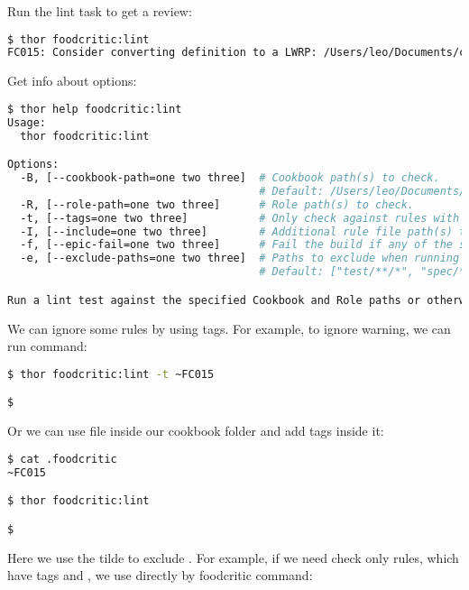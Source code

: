 Run the lint task to get a review:

\begin{lstlisting}[language=Bash,label=lst:testing-thor4]
$ thor foodcritic:lint
FC015: Consider converting definition to a LWRP: /Users/leo/Documents/chef_book/code/my-server-cloud/site-cookbooks/my_cool_app/definitions/enable_web_site.rb:1
\end{lstlisting}

Get info about options:

\begin{lstlisting}[language=Bash,label=lst:testing-thor5]
$ thor help foodcritic:lint
Usage:
  thor foodcritic:lint

Options:
  -B, [--cookbook-path=one two three]  # Cookbook path(s) to check.
                                       # Default: /Users/leo/Documents/chef_book/code/my-server-cloud/site-cookbooks/my_cool_app
  -R, [--role-path=one two three]      # Role path(s) to check.
  -t, [--tags=one two three]           # Only check against rules with the specified tags.
  -I, [--include=one two three]        # Additional rule file path(s) to load.
  -f, [--epic-fail=one two three]      # Fail the build if any of the specified tags are matched.
  -e, [--exclude-paths=one two three]  # Paths to exclude when running tests.
                                       # Default: ["test/**/*", "spec/**/*", "features/**/*"]

Run a lint test against the specified Cookbook and Role paths or otherwise your current working directory.
\end{lstlisting}

We can ignore some rules by using tags. For example, to ignore  warning, we can run command:

\begin{lstlisting}[language=Bash,label=lst:testing-thor6]
$ thor foodcritic:lint -t ~FC015

$
\end{lstlisting}

Or we can use  file inside our cookbook folder and add tags inside it:

\begin{lstlisting}[language=Bash,label=lst:testing-thor7]
$ cat .foodcritic
~FC015

$ thor foodcritic:lint

$
\end{lstlisting}

Here we use the tilde \inline{~} to exclude .
For example, if we need check only rules, which have tags  and , we use directly by foodcritic command:

